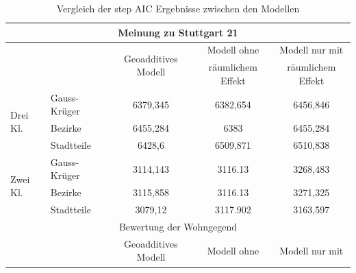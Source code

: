 \documentclass{Vorlage}
\begin{document}
\begin{table}[h]
\centering
\caption{Vergleich der step AIC Ergebnisse zwischen den Modellen}
\label{stepAIC}
\begin{tabular}{llccc}
\hline \hline
\multicolumn{5}{c}{Meinung zu Stuttgart 21}                                                                                                                                            \\ \hline
                          & \multicolumn{1}{l|}{}             & \multicolumn{1}{c|}{\multirow{2}{*}{Geoadditives Modell}} & \multicolumn{1}{c|}{Modell ohne}       & Modell nur mit    \\
                          & \multicolumn{1}{l|}{}             & \multicolumn{1}{c|}{}                                     & \multicolumn{1}{c|}{räumlichem Effekt} & räumlichem Effekt \\ \hline
\multirow{3}{*}{Drei Kl.} & \multicolumn{1}{l|}{Gauss-Krüger} & \multicolumn{1}{c|}{6379,345}                             & \multicolumn{1}{c|}{6382,654}          & 6456,846          \\
                          & \multicolumn{1}{l|}{Bezirke}      & \multicolumn{1}{c|}{6455,284}                             & \multicolumn{1}{c|}{6383}              & 6455,284          \\
                          & \multicolumn{1}{l|}{Stadtteile}   & \multicolumn{1}{c|}{6428,6}                               & \multicolumn{1}{c|}{6509,871}          & 6510,838          \\ \hline
\multirow{3}{*}{Zwei Kl.} & \multicolumn{1}{l|}{Gauss-Krüger} & \multicolumn{1}{c|}{3114,143}                             & \multicolumn{1}{c|}{3116.13}           & 3268,483          \\
                          & \multicolumn{1}{l|}{Bezirke}      & \multicolumn{1}{c|}{3115,858}                             & \multicolumn{1}{c|}{3116.13}           & 3271,325          \\
                          & \multicolumn{1}{l|}{Stadtteile}   & \multicolumn{1}{c|}{3079,12}                              & \multicolumn{1}{c|}{3117.902}          & 3163,597          \\ \hline
\multicolumn{5}{c}{Bewertung der Wohngegend}                                                                                                                                           \\ \hline
                          & \multicolumn{1}{l|}{}             & \multicolumn{1}{c|}{\multirow{2}{*}{Geoadditives Modell}} & \multicolumn{1}{c|}{Modell ohne}       & Modell nur mit    \\

\end{tabular}
\end{table}
\end{document}
